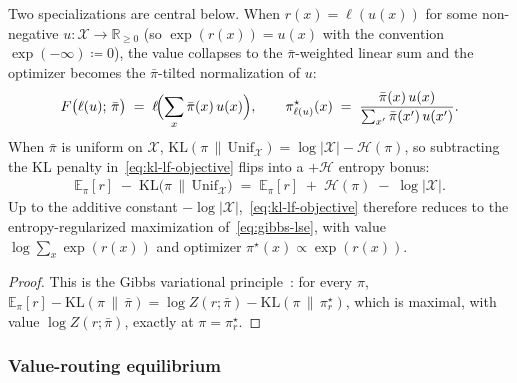 \documentclass[twoside]{article}
\newcommand{\RR}{\mathbb{R}}
\providecommand{\E}{}
\renewcommand{\E}{\mathbb{E}}
\newcommand{\1}{\mathbf{1}}
\begin{document}
Two specializations are central below. When $r(x) = \ell(u(x))$ for some non-negative $u :
    \mathcal{X} \to \RR_{\geq 0}$ (so $\exp(r(x)) = u(x)$ with the convention $\exp(-\infty) \coloneqq
    0$), the value collapses to the $\bar\pi$-weighted linear sum and the optimizer becomes the
$\bar\pi$-tilted normalization of $u$:
\begin{align}\label{eq:kl-lf-linearized}
    F\bigl(\ell(u);\,\bar\pi\bigr) \;=\; \ell\!\Bigl(\sum_{x}\bar\pi(x)\,u(x)\Bigr),
    \qquad
    \pi_{\ell(u)}^\star(x) \;=\; \frac{\bar\pi(x)\,u(x)}{\sum_{x'}\bar\pi(x')\,u(x')}.
\end{align}
When $\bar\pi$ is uniform on $\mathcal{X}$, $\mathrm{KL}(\pi\,\|\,\mathrm{Unif}_\mathcal{X}) =
    \log|\mathcal{X}| - \mathcal{H}(\pi)$, so subtracting the KL penalty in~\eqref{eq:kl-lf-objective}
flips into a $+\mathcal{H}$ entropy bonus:
\begin{align}
    \E_\pi[r] \;-\; \mathrm{KL}\!\bigl(\pi\,\|\,\mathrm{Unif}_\mathcal{X}\bigr)
    \;=\; \E_\pi[r] \;+\; \mathcal{H}(\pi) \;-\; \log|\mathcal{X}|.
\end{align}
Up to the additive constant $-\log|\mathcal{X}|$,~\eqref{eq:kl-lf-objective} therefore reduces to
the entropy-regularized maximization of~\eqref{eq:gibbs-lse}, with value $\log\sum_{x}\exp(r(x))$
and optimizer $\pi^\star(x) \propto \exp(r(x))$.

\begin{proof}
This is the Gibbs variational principle~\citep{BoydVandenberghe2004}: for every $\pi$, $\E_\pi[r] -
    \mathrm{KL}(\pi\,\|\,\bar\pi) = \log Z(r;\bar\pi) - \mathrm{KL}(\pi\,\|\,\pi_r^\star)$, which is
maximal, with value $\log Z(r;\bar\pi)$, exactly at $\pi = \pi_r^\star$.
\end{proof}

\subsubsection{Value-routing equilibrium}\label{app:attention-value-routing}
\end{document}

